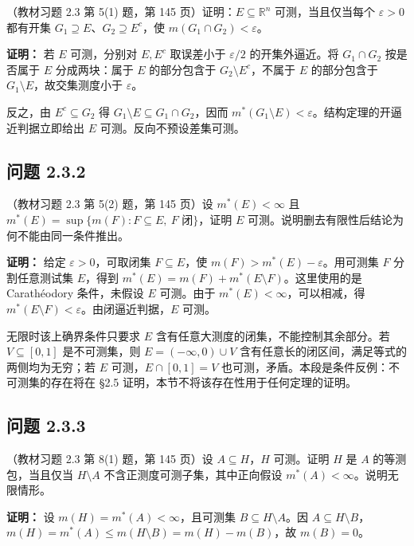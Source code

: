 \documentclass[11pt,a4paper]{article}
\begin{document}
（教材习题 2.3 第 5(1) 题，第 145 页）证明：\(E\subseteq\mathbb R^n\)
可测，当且仅当每个 \(\varepsilon>0\) 都有开集
\(G_1\supseteq E\)、\(G_2\supseteq E^c\)，使
\(m(G_1\cap G_2)<\varepsilon\)。

\textbf{证明：} 若 \(E\) 可测，分别对 \(E,E^c\) 取误差小于
\(\varepsilon/2\) 的开集外逼近。将 \(G_1\cap G_2\) 按是否属于 \(E\)
分成两块：属于 \(E\) 的部分包含于 \(G_2\setminus E^c\)，不属于 \(E\)
的部分包含于 \(G_1\setminus E\)，故交集测度小于 \(\varepsilon\)。

反之，由 \(E^c\subseteq G_2\) 得
\(G_1\setminus E\subseteq G_1\cap G_2\)，因而
\(m^*(G_1\setminus E)<\varepsilon\)。结构定理的开逼近判据立即给出 \(E\)
可测。反向不预设差集可测。

\subsection{问题 2.3.2}\label{ux95eeux9898-2.3.2}

（教材习题 2.3 第 5(2) 题，第 145 页）设 \(m^*(E)<\infty\) 且
\(m^*(E)=\sup\{m(F):F\subseteq E,\ F\text{ 闭}\}\)，证明 \(E\)
可测。说明删去有限性后结论为何不能由同一条件推出。

\textbf{证明：} 给定 \(\varepsilon>0\)，可取闭集 \(F\subseteq E\)，使
\(m(F)>m^*(E)-\varepsilon\)。用可测集 \(F\) 分割任意测试集 \(E\)，得到
\(m^*(E)=m(F)+m^*(E\setminus F)\)。这里使用的是 Carathéodory
条件，未假设 \(E\) 可测。由于 \(m^*(E)<\infty\)，可以相减，得
\(m^*(E\setminus F)<\varepsilon\)。由闭逼近判据，\(E\) 可测。

无限时该上确界条件只要求 \(E\)
含有任意大测度的闭集，不能控制其余部分。若 \(V\subseteq[0,1]\)
是不可测集，则 \(E=(-\infty,0)\cup V\)
含有任意长的闭区间，满足等式的两侧均为无穷；若 \(E\)
可测，\(E\cap[0,1]=V\) 也可测，矛盾。本段是条件反例：不可测集的存在将在
§2.5 证明，本节不将该存在性用于任何定理的证明。

\subsection{问题 2.3.3}\label{ux95eeux9898-2.3.3}

（教材习题 2.3 第 8(1) 题，第 145 页）设 \(A\subseteq H\)，\(H\)
可测。证明 \(H\) 是 \(A\) 的等测包，当且仅当 \(H\setminus A\)
不含正测度可测子集，其中正向假设 \(m^*(A)<\infty\)。说明无限情形。

\textbf{证明：} 设 \(m(H)=m^*(A)<\infty\)，且可测集
\(B\subseteq H\setminus A\)。因 \(A\subseteq H\setminus B\)，
\(m(H)=m^*(A)\le m(H\setminus B)=m(H)-m(B)\)，故 \(m(B)=0\)。
\end{document}
